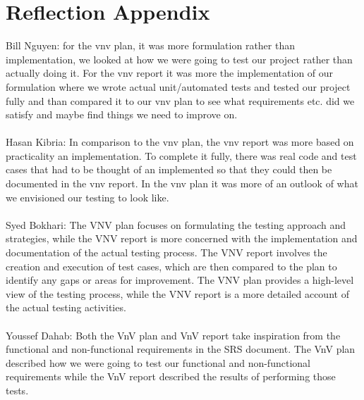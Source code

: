 \documentclass[12pt, titlepage]{article}
\begin{document}
\section{Reflection Appendix}
Bill Nguyen: for the vnv plan, it was more formulation rather than implementation, we looked at how we were going to test our project rather than actually doing it. For the vnv report it was more the implementation of our formulation where we wrote actual unit/automated tests and tested our project fully and than compared it to our vnv plan to see what requirements etc. did we satisfy and maybe find things we need to improve on.\\\\
Hasan Kibria: In comparison to the vnv plan, the vnv report was more based on practicality an implementation. To complete it fully, there was real code and test cases that had to be thought of an implemented so that they could then be documented in the vnv report. In the vnv plan it was more of an outlook of what we envisioned our testing to look like.\\\\
Syed Bokhari: The VNV plan focuses on formulating the testing approach and strategies, while the VNV report is more concerned with the implementation and documentation of the actual testing process. The VNV report involves the creation and execution of test cases, which are then compared to the plan to identify any gaps or areas for improvement. The VNV plan provides a high-level view of the testing process, while the VNV report is a more detailed account of the actual testing activities.\\\\
Youssef Dahab: Both the VnV plan and VnV report take inspiration from the functional and non-functional requirements in the SRS document. The VnV plan described how we were going to test our functional and non-functional requirements while the VnV report described the results of performing those tests.\\\\




\end{document}
